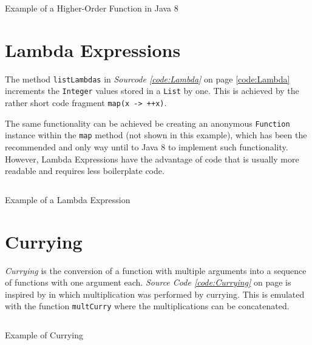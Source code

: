 \documentclass[a4paper,12pt,twoside]{scrreprt}
\begin{document}
\begin{listing}[ht]
    \inputminted[fontsize=\footnotesize,linenos,breaklines,breakanywhere]{java}{./code/HigherOrderFunctions.java}
    \caption[Example of a Higher-Order Function in Java 8]{Example of a Higher-Order Function in Java 8}
    \label{code:higherordered}
\end{listing}

\clearpage

\section{Lambda Expressions}
The method \texttt{listLambdas} in \textit{Sourcode \ref{code:Lambda}} on page \ref{code:Lambda} increments the \texttt{Integer} values stored in a \texttt{List} by one. This is achieved by the rather short code fragment \texttt{map(x -> ++x)}.

The same functionality can be achieved be creating an anonymous \texttt{Function} instance within the \texttt{map} method (not shown in this example), which has been the recommended and only way until to Java 8 to implement such functionality. However, Lambda Expressions have the advantage of code that is usually more readable and requires less boilerplate code.

\begin{listing}[ht]
    \inputminted[fontsize=\footnotesize,linenos]{java}{./code/LambdaExpressions.java}
    \caption[Example of a Lambda Expression]{Example of a Lambda Expression}
    \label{code:Lambda}
\end{listing}

\clearpage

\section{Currying}
\textit{Currying} is the conversion of a function with multiple arguments into a sequence of functions with one argument each. \textit{Source Code \ref{code:Currying}} on page \pageref{code:Currying} is inspired by \cite{Robertson_currying_2018} in which multiplication was performed by currying. This is emulated with the function \texttt{multCurry} where the multiplications can be concatenated.

\begin{listing}[ht]
    \inputminted[fontsize=\footnotesize,linenos,breaklines,breakanywhere]{java}{./code/Currying.java}
    \caption[Example of Currying]{Example of Currying}
    \label{code:Currying}
\end{listing}
\end{document}
